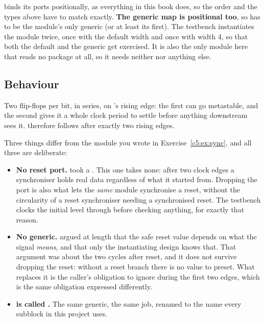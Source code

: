  binds its ports positionally, as everything in this book does, so the order and
the types above have to match exactly. \textbf{The generic map is positional too}, so  has
to be the module's only generic (or at least its first). The testbench instantiates the module twice,
once with the default width and once with width 4, so that both the default and the generic get
exercised. It is also the only module here that reads no package at all, so it needs neither
 nor anything else.

\subsection{Behaviour}
\label{c12:sub:mpbehav}

Two flip-flops per bit, in series, on 's rising edge: the first can go metastable, and
the second gives it a whole clock period to settle before anything downstream sees it.
 therefore follows  after exactly two rising edges.

Three things differ from the  module you wrote in Exercise~\ref{c5:ex:sync}, and all three
are deliberate:
\begin{itemize}
  \item \textbf{No reset port.}  took a . This one takes none: after two
    clock edges a synchroniser holds real data regardless of what it started from. Dropping the port
    is also what lets the \emph{same} module synchronise a reset, without the circularity of a reset
    synchroniser needing a synchronised reset. The testbench clocks the initial level through before
    checking anything, for exactly that reason.
  \item \textbf{No  generic.}  argued at length that the safe reset value
    depends on what the signal \emph{means}, and that only the instantiating design knows that. That
    argument was about the two cycles after reset, and it does not survive dropping the reset:
    without a reset branch there is no value to preset. What replaces it is the caller's obligation
    to ignore  during the first two edges, which is the same obligation expressed
    differently.
  \item \textbf{ is called .} The same generic, the same job, renamed to the
    name every subblock in this project uses.
\end{itemize}

